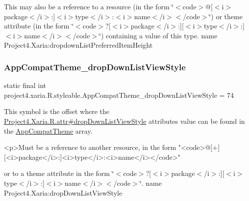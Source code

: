 This may also be a reference to a resource (in the form \char`\"{}$<$code$>$@\mbox{[}$<$i$>$package$<$/i$>$\+:\mbox{]}$<$i$>$type$<$/i$>$\+:$<$i$>$name$<$/i$>$$<$/code$>$\char`\"{}) or theme attribute (in the form \char`\"{}$<$code$>$?\mbox{[}$<$i$>$package$<$/i$>$\+:\mbox{]}\mbox{[}$<$i$>$type$<$/i$>$\+:\mbox{]}$<$i$>$name$<$/i$>$$<$/code$>$\char`\"{}) containing a value of this type.  name Project4.\+Xaria\+:dropdown\+List\+Preferred\+Item\+Height \mbox{\label{classproject4_1_1xaria_1_1R_1_1styleable_ac0bd97fcf21ebf1428f0681d50718950}} 
\subsubsection{\texorpdfstring{App\+Compat\+Theme\+\_\+drop\+Down\+List\+View\+Style}{AppCompatTheme\_dropDownListViewStyle}}
{\footnotesize\ttfamily static final int project4.\+xaria.\+R.\+styleable.\+App\+Compat\+Theme\+\_\+drop\+Down\+List\+View\+Style = 74\hspace{0.3cm}{\ttfamily [static]}}

This symbol is the offset where the \hyperlink{}{Project4.\+Xaria.\+R.\+attr\#drop\+Down\+List\+View\+Style} attribute\textquotesingle{}s value can be found in the \hyperlink{classproject4_1_1xaria_1_1R_1_1styleable_aad8bec413e2350f9404e6ff0e831a85d}{App\+Compat\+Theme} array.

\begin{DoxyVerb}      <p>Must be a reference to another resource, in the form "<code>@[+][<i>package</i>:]<i>type</i>:<i>name</i></code>"
\end{DoxyVerb}
 or to a theme attribute in the form \char`\"{}$<$code$>$?\mbox{[}$<$i$>$package$<$/i$>$\+:\mbox{]}\mbox{[}$<$i$>$type$<$/i$>$\+:\mbox{]}$<$i$>$name$<$/i$>$$<$/code$>$\char`\"{}.  name Project4.\+Xaria\+:drop\+Down\+List\+View\+Style \mbox{\label{classproject4_1_1xaria_1_1R_1_1styleable_a197825ebee98f93494e82626ee54087e}} 
